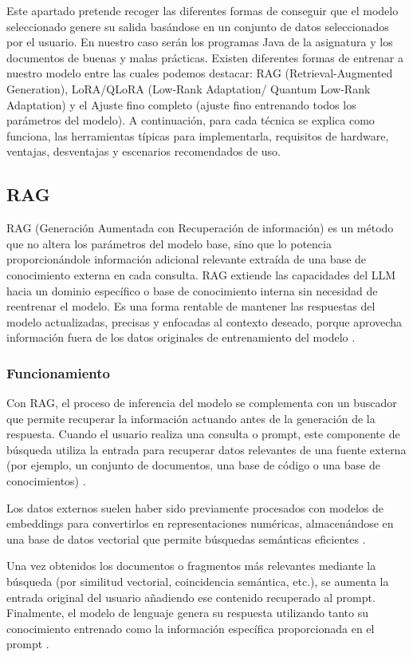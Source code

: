 Este apartado pretende recoger las diferentes formas de conseguir que el modelo seleccionado genere su salida basándose en un conjunto de datos seleccionados por el usuario. En nuestro caso serán los programas Java de la asignatura y los documentos de buenas y malas prácticas. Existen diferentes formas de entrenar a nuestro modelo entre las cuales podemos destacar:  RAG (Retrieval-Augmented Generation), LoRA/QLoRA (Low-Rank Adaptation/ Quantum  Low-Rank Adaptation) y el Ajuste fino completo (ajuste fino entrenando todos los parámetros del modelo). A continuación, para cada técnica se explica como  funciona, las herramientas típicas para implementarla, requisitos de hardware, ventajas, desventajas y escenarios recomendados de uso.

\subsection{RAG}
RAG (Generación Aumentada con Recuperación de información) es un método que no altera los parámetros del modelo base, sino que lo potencia proporcionándole información adicional relevante extraída de una base de conocimiento externa en cada consulta. RAG extiende las capacidades del LLM hacia un dominio específico o base de conocimiento interna sin necesidad de reentrenar el modelo. Es una forma rentable de mantener las respuestas del modelo actualizadas, precisas y enfocadas al contexto deseado, porque aprovecha información fuera de los datos originales de entrenamiento del modelo \cite{RAG-Amazon}.

\subsubsection{Funcionamiento}
Con RAG, el proceso de inferencia del modelo se complementa con un buscador que permite recuperar la información actuando antes de la generación de la respuesta. Cuando el usuario realiza una consulta o prompt, este componente de búsqueda utiliza la entrada para recuperar datos relevantes de una fuente externa (por ejemplo, un conjunto de documentos, una base de código o una base de conocimientos) \cite{RAG-Amazon}.

Los datos externos suelen haber sido previamente procesados con modelos de embeddings para convertirlos en representaciones numéricas, almacenándose en una base de datos vectorial que permite búsquedas semánticas eficientes \cite{RAG-Amazon}.

Una vez obtenidos los documentos o fragmentos más relevantes mediante la búsqueda (por similitud vectorial, coincidencia semántica, etc.), se aumenta la entrada original del usuario añadiendo ese contenido recuperado al prompt. Finalmente, el modelo de lenguaje genera su respuesta utilizando tanto su conocimiento entrenado como la información específica proporcionada en el prompt \cite{RAG-Amazon}.

